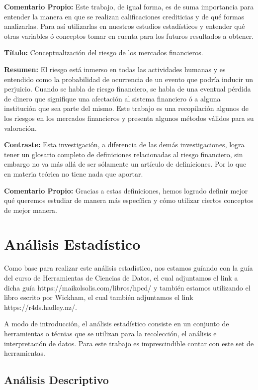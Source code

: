 \documentclass[
  letterpaper,
  DIV=11,
  numbers=noendperiod]{scrreprt}
\begin{document}
\textbf{Comentario Propio:} Este trabajo, de igual forma, es de suma
importancia para entender la manera en que se realizan calificaciones
crediticias y de qué formas analizarlas. Para así utilizarlas en
nuestros estudios estadísticos y entender qué otras variables ó
conceptos tomar en cuenta para los futuros resultados a obtener.

\textbf{Título:} Conceptualización del riesgo de los mercados
financieros.

\textbf{Resumen:} El riesgo está inmerso en todas las actividades
humanas y es entendido como la probabilidad de ocurrencia de un evento
que podría inducir un perjuicio. Cuando se habla de riesgo financiero,
se habla de una eventual pérdida de dinero que signifique una afectación
al sistema financiero ó a alguna institución que sea parte del mismo.
Este trabajo es una recopilación algunos de los riesgos en los mercados
financieros y presenta algunos métodos válidos para su valoración.

\textbf{Contraste:} Esta investigación, a diferencia de las demás
investigaciones, logra tener un glosario completo de definiciones
relacionadas al riesgo financiero, sin embargo no va más allá de ser
sólamente un artículo de definiciones. Por lo que en materia teórica no
tiene nada que aportar.

\textbf{Comentario Propio:} Gracias a estas definiciones, hemos logrado
definir mejor qué queremos estudiar de manera más específica y cómo
utilizar ciertos conceptos de mejor manera.

\section{Análisis Estadístico}\label{anuxe1lisis-estaduxedstico}

Como base para realizar este análisis estadístico, nos estamos guíando
con la guía del curso de Herramientas de Ciencias de Datos, el cual
adjuntamos el link a dicha guía https://maikolsolis.com/libros/hpcd/ y
también estamos utilizando el libro escrito por Wickham, el cual también
adjuntamos el link https://r4ds.hadley.nz/.

A modo de introducción, el análisis estadístico consiste en un conjunto
de herramientas o técnias que se utilizan para la recolección, el
análisis e interpretación de datos. Para este trabajo es imprescindible
contar con este set de herramientas.

\subsection{Análisis Descriptivo}\label{anuxe1lisis-descriptivo}
\end{document}
